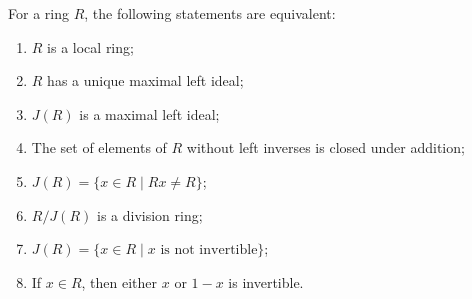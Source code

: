 For a ring $R$, the following statements are equivalent:
\begin{enumerate}
\item[(a)] $R$ is a local ring;
\item[(b)] $R$ has a unique maximal left ideal;
\item[(c)] $J(R)$ is a maximal left ideal;
\item[(d)] The set of elements of $R$ without left inverses is closed under addition;
\item[(e)] $J(R) = \{x \in R \mid Rx \neq R\}$;
\item[(f)] $R/J(R)$ is a division ring;
\item[(g)] $J(R) = \{x \in R \mid x \text{ is not invertible}\}$;
\item[(h)] If $x \in R$, then either $x$ or $1 - x$ is invertible.
\end{enumerate}
